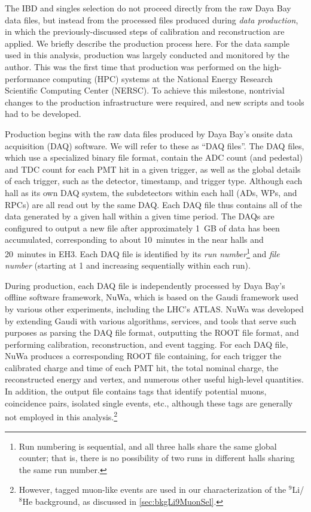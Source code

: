\documentclass[../thesis.tex]{subfiles}
\begin{document}
The IBD and singles selection do not proceed directly from the raw Daya Bay data files, but instead from the processed files produced during \emph{data production}, in which the previously-discussed steps of calibration and reconstruction are applied. We briefly describe the production process here. For the data sample used in this analysis, production was largely conducted and monitored by the author. This was the first time that production was performed on the high-performance computing (HPC) systems at the National Energy Research Scientific Computing Center (NERSC). To achieve this milestone, nontrivial changes to the production infrastructure were required, and new scripts and tools had to be developed.

Production begins with the raw data files produced by Daya Bay's onsite data acquisition (DAQ) software. We will refer to these as ``DAQ files''. The DAQ files, which use a specialized binary file format, contain the ADC count (and pedestal) and TDC count for each PMT hit in a given trigger, as well as the global details of each trigger, such as the detector, timestamp, and trigger type. Although each hall as its own DAQ system, the subdetectors within each hall (ADs, WPs, and RPCs) are all read out by the same DAQ. Each DAQ file thus contains all of the data generated by a given hall within a given time period. The DAQs are configured to output a new file after approximately 1~GB of data has been accumulated, corresponding to about 10~minutes in the near halls and 20~minutes in EH3. Each DAQ file is identified by its \emph{run number}\footnote{Run numbering is sequential, and all three halls share the same global counter; that is, there is no possibility of two runs in different halls sharing the same run number.} and \emph{file number} (starting at 1 and increasing sequentially within each run).

During production, each DAQ file is independently processed by Daya Bay's offline software framework, NuWa, which is based on the Gaudi \cite{gaudi} framework used by various other experiments, including the LHC's ATLAS. NuWa was developed by extending Gaudi with various algorithms, services, and tools that serve such purposes as parsing the DAQ file format, outputting the ROOT file format, and performing calibration, reconstruction, and event tagging. For each DAQ file, NuWa produces a corresponding ROOT file containing, for each trigger the calibrated charge and time of each PMT hit, the total nominal charge, the reconstructed energy and vertex, and numerous other useful high-level quantities. In addition, the output file contains tags that identify potential muons, coincidence pairs, isolated single events, etc., although these tags are generally not employed in this analysis.\footnote{However, tagged muon-like events are used in our characterization of the $^9$Li/$^8$He background, as discussed in \autoref{sec:bkgLi9MuonSel}.}
\end{document}
